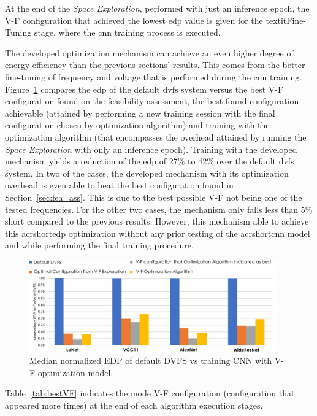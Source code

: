 At the end of the \textit{Space Exploration}, performed with just an inference epoch, the V-F configuration that achieved the lowest \acrshort{edp} value is given for the textit{Fine-Tuning} stage, where the \acrshort{cnn}  training process is executed.

The developed optimization mechanism can achieve an even higher degree of energy-efficiency than the previous sections' results. This comes from the better fine-tuning of frequency and voltage that is performed during the \acrshort{cnn} training. Figure~\ref{fig:Algori_comp} compares the \acrshort{edp} of the default \acrshort{dvfs} system versus the best V-F configuration found on the feasibility assessment, the best found configuration achievable (attained by performing a new training session with the final configuration chosen by optimization algorithm) and training with the optimization algorithm (that encompasses the overhead attained by running the \textit{Space Exploration} with only an inference epoch). Training with the developed mechanism yields a reduction of the \acrshort{edp} of 27\% to 42\% over the default \acrshort{dvfs} system. In two of the cases, the developed mechanism with its optimization overhead is even able to beat the best configuration found in Section~\ref{sec:fea_ass}. This is due to the best possible V-F not being one of the tested frequencies. For the other two cases, the mechanism only falls less than 5\% short compared to the previous results. However, this mechanism able to achieve this acrshort{edp} optimization without any prior testing of the acrshort{cnn} model and while performing the final training procedure.
\begin{figure}[htb]
    \centering
        \includegraphics[width=0.95\textwidth]{Figures/Application To Deep Learning/Algorithm_Opt_comp.pdf}
        \caption{Median normalized EDP of default DVFS vs training CNN with V-F optimization model.}
    \label{fig:Algori_comp}
\end{figure}

Table~\ref{tab:bestVF} indicates the mode V-F configuration (configuration that appeared more times) at the end of each algorithm execution stages.

